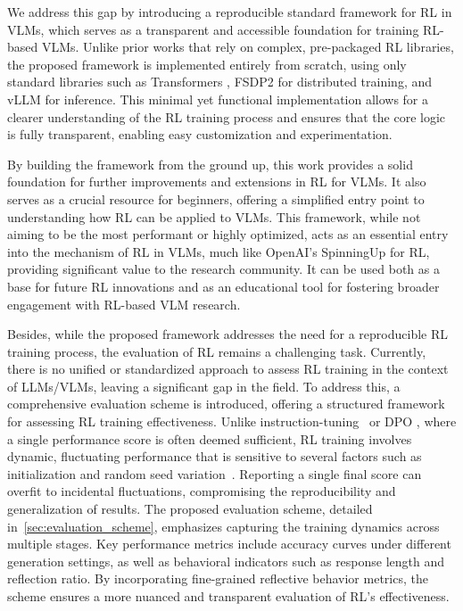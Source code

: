 \documentclass{article} %
\begin{document}
We address this gap by introducing a reproducible standard framework for RL in VLMs, which serves as a transparent and accessible foundation for training RL-based VLMs. Unlike prior works that rely on complex, pre-packaged RL libraries, the proposed framework is implemented entirely from scratch, using only standard libraries such as Transformers \citep{wolf-etal-2020-transformers}, FSDP2 \citep{zhao2023pytorch} for distributed training, and vLLM \citep{kwon2023efficient} for inference. This minimal yet functional implementation allows for a clearer understanding of the RL training process and ensures that the core logic is fully transparent, enabling easy customization and experimentation.

By building the framework from the ground up, this work provides a solid foundation for further improvements and extensions in RL for VLMs. It also serves as a crucial resource for beginners, offering a simplified entry point to understanding how RL can be applied to VLMs. This framework, while not aiming to be the most performant or highly optimized, acts as an essential entry into the mechanism of RL in VLMs, much like OpenAI's SpinningUp \citep{SpinningUp2018} for RL, providing significant value to the research community. It can be used both as a base for future RL innovations and as an educational tool for fostering broader engagement with RL-based VLM research.

Besides, while the proposed framework addresses the need for a reproducible RL training process, the evaluation of RL remains a challenging task. Currently, there is no unified or standardized approach to assess RL training in the context of LLMs/VLMs, leaving a significant gap in the field.
%
To address this, a comprehensive evaluation scheme is introduced, offering a structured framework for assessing RL training effectiveness. Unlike instruction-tuning~\citep{zhang2023instruction} or DPO \citep{rafailov2023DPO}, where a single performance score is often deemed sufficient, RL training involves dynamic, fluctuating performance that is sensitive to several factors such as initialization and random seed variation~\citep{henderson2018deep,andrychowicz2020matters}. Reporting a single final score can overfit to incidental fluctuations, compromising the reproducibility and generalization of results.
%
The proposed evaluation scheme, detailed in~\cref{sec:evaluation_scheme}, emphasizes capturing the training dynamics across multiple stages. Key performance metrics include accuracy curves under different generation settings, as well as behavioral indicators such as response length and reflection ratio. By incorporating fine-grained reflective behavior metrics, the scheme ensures a more nuanced and transparent evaluation of RL’s effectiveness.
\end{document}
